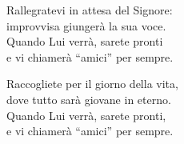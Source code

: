 

\spazio

\strofa Rallegratevi in attesa del Signore:\\
improvvisa giungerà la sua voce.\\
Quando Lui verrà, sarete pronti\\
e vi chiamerà ``amici'' per sempre.

\spazio


\spazio

\strofa Raccogliete per il giorno della vita,\\
dove tutto sarà giovane in eterno.\\
Quando Lui verrà, sarete pronti,\\
e vi chiamerà ``amici'' per sempre.

\spazio

